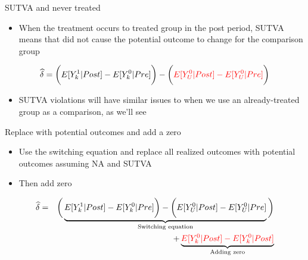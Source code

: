 \documentclass{beamer}
\begin{document}
\begin{frame}{SUTVA and never treated}

\begin{itemize}
\item When the treatment occurs to treated group in the post period, SUTVA means that did not cause the potential outcome to change for the comparison group
\end{itemize}

\begin{eqnarray*}
\widehat{\delta} = \bigg ( E[Y^1_k|Post] - \textcolor{black}{E[Y^0_k|Pre]} \bigg ) - \bigg ( \textcolor{red}{E[Y^0_U | Post ] - E[ Y^0_U | Pre] }\bigg) \\
\end{eqnarray*}

\begin{itemize}
\item SUTVA violations will have similar issues to when we use an already-treated group as a comparison, as we'll see
\end{itemize}


\end{frame}




\begin{frame}{Replace with potential outcomes and add a zero}

\begin{itemize}
\item Use the switching equation and replace all realized outcomes with potential outcomes assuming NA and SUTVA
\item Then add zero
\end{itemize}

\begin{eqnarray*}
\widehat{\delta} &=& \bigg ( \underbrace{E[Y^1_k|Post] - E[Y^0_k|Pre] \bigg ) - \bigg ( E[Y^0_U | Post ] - E[ Y^0_U | Pre]}_{\mathclap{\text{Switching equation}}} \bigg)  \\
&&+ \underbrace{\textcolor{red}{E[Y_k^0 |Post] - E[Y^0_k | Post]}}_{\mathclap{\text{Adding zero}}} 
\end{eqnarray*}

\end{frame}
\end{document}
